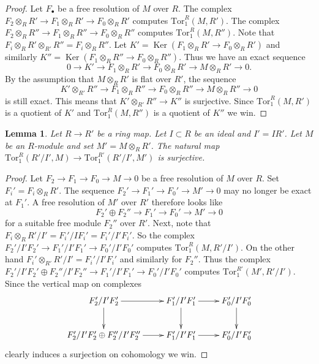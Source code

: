 \documentclass{amsart}
\theoremstyle{plain}
\newtheorem{lemma}[subsection]{Lemma}
\theoremstyle{definition}
\theoremstyle{remark}
\numberwithin{equation}{subsection}
\def\Ker{\mathop{\mathrm{Ker}}}
\begin{document}
\begin{proof}
Let $F_\bullet$ be a free resolution of $M$ over $R$.
The complex $F_2 \otimes_R R' \to F_1\otimes_R R' \to F_0 \otimes_R R'$
computes $\text{Tor}_1^R(M, R')$.
The complex $F_2 \otimes_R R'' \to F_1\otimes_R R'' \to F_0 \otimes_R R''$
computes $\text{Tor}_1^R(M, R'')$. Note that
$F_i \otimes_R R' \otimes_{R'} R'' = F_i \otimes_R R''$. Let
$K' = \Ker(F_1\otimes_R R' \to F_0 \otimes_R R')$ and
similarly $K'' = \Ker(F_1\otimes_R R'' \to F_0 \otimes_R R'')$.
Thus we have an exact sequence
$$
0 \to K' \to F_1\otimes_R R' \to F_0 \otimes_R R' \to M \otimes_R R' \to 0.
$$
By the assumption that $M \otimes_R R'$ is flat over $R'$,
the sequence
$$
K' \otimes_{R'} R'' \to
F_1 \otimes_R R'' \to
F_0 \otimes_R R'' \to
M \otimes_R R'' \to 0
$$
is still exact. This means that $K' \otimes_{R'} R'' \to K''$
is surjective. Since $\text{Tor}_1^R(M, R')$ is a quotient of $K'$ and
$\text{Tor}_1^R(M, R'')$ is a quotient of $K''$ we win.
\end{proof}


\begin{lemma}
\label{lemma-surjective-on-tor-one-trivial}
Let $R \to R'$ be a ring map. Let $I \subset R$ be
an ideal and $I' = IR'$. Let $M$ be an $R$-module
and set $M' = M \otimes_R R'$. The natural map
$\text{Tor}_1^R(R'/I', M) \to \text{Tor}_1^{R'}(R'/I', M')$
is surjective.
\end{lemma}

\begin{proof}
Let $F_2 \to F_1 \to F_0 \to M \to 0$ be a free resolution of
$M$ over $R$. Set $F_i' = F_i \otimes_R R'$. The sequence
$F_2' \to F_1' \to F_0' \to M' \to 0$ may no longer be exact
at $F_1'$. A free resolution of $M'$ over $R'$ therefore looks
like
$$
F_2' \oplus F_2'' \to F_1' \to F_0' \to M' \to 0
$$
for a suitable free module $F_2''$ over $R'$. Next, note that
$F_i \otimes_R R'/I' = F_i' / IF_i' = F_i'/I'F_i'$.
So the complex $F_2'/I'F_2' \to F_1'/I'F_1' \to F_0'/I'F_0'$
computes $\text{Tor}_1^R(M, R'/I')$. On the other hand
$F_i' \otimes_{R'} R'/I' = F_i'/I'F_i'$ and similarly
for $F_2''$. Thus the complex
$F_2'/I'F_2' \oplus F_2''/I'F_2'' \to F_1'/I'F_1' \to F_0'/I'F_0'$
computes $\text{Tor}_1^{R'}(M', R'/I')$. Since the vertical
map on complexes
$$
\xymatrix{
F_2'/I'F_2' \ar[r] \ar[d] &
F_1'/I'F_1' \ar[r] \ar[d] &
F_0'/I'F_0' \ar[d] \\
F_2'/I'F_2' \oplus F_2''/I'F_2'' \ar[r] &
F_1'/I'F_1' \ar[r] &
F_0'/I'F_0'
}
$$
clearly induces a surjection on cohomology we win.
\end{proof}
\end{document}
